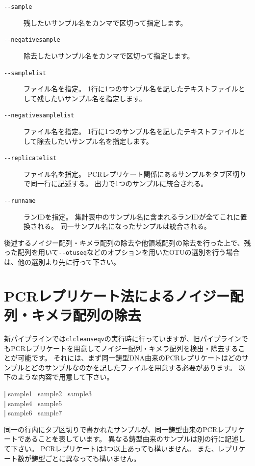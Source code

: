 \documentclass[titlepage,10pt,a4paper]{jsbook}
\newenvironment{content}{\begin{shaded}\vspace{-1em}\raggedright\ttfamily\footnotesize\setlength{\baselineskip}{1.4em}}{\end{shaded}\vspace{-1em}}
\begin{document}
\begin{description}
\item[\texttt{{-}{-}sample}] 残したいサンプル名をカンマで区切って指定します。
\item[\texttt{{-}{-}negativesample}] 除去したいサンプル名をカンマで区切って指定します。
\item[\texttt{{-}{-}samplelist}] ファイル名を指定。
1行に1つのサンプル名を記したテキストファイルとして残したいサンプル名を指定します。
\item[\texttt{{-}{-}negativesamplelist}] ファイル名を指定。
1行に1つのサンプル名を記したテキストファイルとして除去したいサンプル名を指定します。
\item[\texttt{{-}{-}replicatelist}] ファイル名を指定。
PCRレプリケート関係にあるサンプルをタブ区切りで同一行に記述する。
出力で1つのサンプルに統合される。
\item[\texttt{{-}{-}runname}] ランIDを指定。
集計表中のサンプル名に含まれるランIDが全てこれに置換される。
同一サンプル名になったサンプルは統合される。
\end{description}

後述するノイジー配列・キメラ配列の除去や他領域配列の除去を行った上で、残った配列を用いて\texttt{{-}{-}otuseq}などのオプションを用いたOTUの選別を行う場合は、他の選別より先に行って下さい。

\section{PCRレプリケート法によるノイジー配列・キメラ配列の除去}

新パイプラインでは\texttt{clcleanseqv}の実行時に行っていますが、旧パイプラインでもPCRレプリケートを用意してノイジー配列・キメラ配列を検出・除去することが可能です。
それには、まず同一鋳型DNA由来のPCRレプリケートはどのサンプルとどのサンプルなのかを記したファイルを用意する必要があります。
以下のような内容で用意して下さい。
\begin{content}
| sample1~ sample2~ sample3\\
| sample4~ sample5\\
| sample6~ sample7
\end{content}
同一の行内にタブ区切りで書かれたサンプルが、同一鋳型由来のPCRレプリケートであることを表しています。
異なる鋳型由来のサンプルは別の行に記述して下さい。
PCRレプリケートは3つ以上あっても構いません。
また、レプリケート数が鋳型ごとに異なっても構いません。
\end{document}
